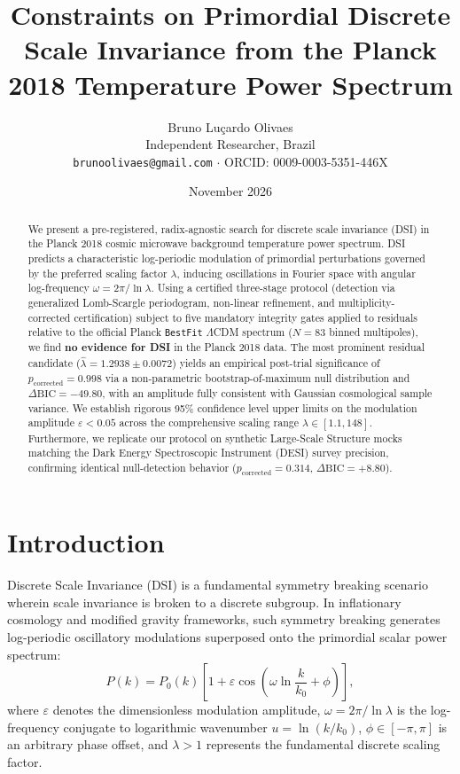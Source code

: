 \documentclass[10pt,twocolumn,a4paper]{article}
\title{\textbf{Constraints on Primordial Discrete Scale Invariance from the Planck 2018 Temperature Power Spectrum}}
\author{Bruno Lu\c{c}ardo Olivaes \\ \small Independent Researcher, Brazil \\ \small \texttt{brunoolivaes@gmail.com} $\cdot$ ORCID: 0009-0003-5351-446X}
\date{November 2026}
\begin{document}
\maketitle

\begin{abstract}
\noindent We present a pre-registered, radix-agnostic search for discrete scale invariance (DSI) in the Planck 2018 cosmic microwave background temperature power spectrum. DSI predicts a characteristic log-periodic modulation of primordial perturbations governed by the preferred scaling factor $\lambda$, inducing oscillations in Fourier space with angular log-frequency $\omega = 2\pi/\ln\lambda$. Using a certified three-stage protocol (detection via generalized Lomb-Scargle periodogram, non-linear refinement, and multiplicity-corrected certification) subject to five mandatory integrity gates applied to residuals relative to the official Planck \texttt{BestFit} $\Lambda$CDM spectrum ($N = 83$ binned multipoles), we find \textbf{no evidence for DSI} in the Planck 2018 data. The most prominent residual candidate ($\hat\lambda = 1.2938 \pm 0.0072$) yields an empirical post-trial significance of $p_{\mathrm{corrected}} = 0.998$ via a non-parametric bootstrap-of-maximum null distribution and $\Delta\mathrm{BIC} = -49.80$, with an amplitude fully consistent with Gaussian cosmological sample variance. We establish rigorous 95\% confidence level upper limits on the modulation amplitude $\varepsilon < 0.05$ across the comprehensive scaling range $\lambda \in [1.1, 148]$. Furthermore, we replicate our protocol on synthetic Large-Scale Structure mocks matching the Dark Energy Spectroscopic Instrument (DESI) survey precision, confirming identical null-detection behavior ($p_{\mathrm{corrected}} = 0.314$, $\Delta\mathrm{BIC} = +8.80$).
\end{abstract}

\section{Introduction}
Discrete Scale Invariance (DSI) is a fundamental symmetry breaking scenario wherein scale invariance is broken to a discrete subgroup. In inflationary cosmology and modified gravity frameworks, such symmetry breaking generates log-periodic oscillatory modulations superposed onto the primordial scalar power spectrum:
\begin{equation}
P(k) = P_0(k) \left[ 1 + \varepsilon \cos\left( \omega \ln\frac{k}{k_0} + \phi \right) \right],
\end{equation}
where $\varepsilon$ denotes the dimensionless modulation amplitude, $\omega = 2\pi/\ln\lambda$ is the log-frequency conjugate to logarithmic wavenumber $u = \ln(k/k_0)$, $\phi \in [-\pi, \pi]$ is an arbitrary phase offset, and $\lambda > 1$ represents the fundamental discrete scaling factor.
\end{document}

